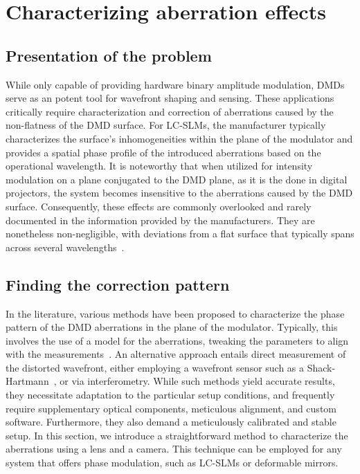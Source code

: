 \documentclass[12pt]{iopart}
\begin{document}


\section{Characterizing aberration effects}

\subsection{Presentation of the problem}

While only capable of providing hardware binary amplitude modulation,
DMDs serve as an potent tool for wavefront shaping and sensing.
These applications  critically require characterization and correction of aberrations
caused by the non-flatness of the DMD surface.
For LC-SLMs, the manufacturer typically characterizes the surface's inhomogeneities within the plane of the modulator and
provides a spatial phase profile of the introduced aberrations based on the operational wavelength.
It is noteworthy that when utilized for intensity modulation on a plane conjugated to the DMD plane,
as it is the done in digital projectors,
the system becomes insensitive to the aberrations caused by the DMD surface.
Consequently, these effects are commonly overlooked and rarely documented in the information provided by the manufacturers.
They are nonetheless non-negligible, with deviations from a flat surface
that typically spans across several wavelengths~\cite{Brown2021multicolor}.\\



\subsection{Finding the correction pattern}

In the literature, various methods have been proposed to characterize
the phase pattern of the DMD aberrations in the plane of the modulator.
Typically, this involves the use of a model for the aberrations,
tweaking the parameters to align with the measurements~\cite{Matthes2019Optical,Scholes2019structured, Brown2021multicolor}.
An alternative approach entails direct measurement of the distorted wavefront,
either employing a wavefront sensor such as a Shack-Hartmann~\cite{Lee2023compensation},
or via interferometry.
While such methods yield accurate results,
they necessitate adaptation to the particular
setup conditions,
and frequently require supplementary optical components,
meticulous alignment,
and custom software.
Furthermore, they also demand
a meticulously calibrated and stable setup.
In this section, we introduce a straightforward method to characterize the aberrations using a lens and a camera.
This technique can be employed for any system that offers phase modulation,
such as LC-SLMs or deformable mirrors. \\
\end{document}

